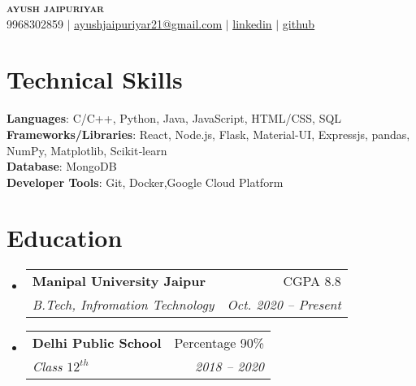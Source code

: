\documentclass[a4paper,11pt]{article}
\makeatletter
\newcommand{\resumeSubheading}[4]{
    \vspace{-2pt}\item
    \begin{tabular*}{0.97\textwidth}[t]{l@{\extracolsep{\fill}}r}
        \textbf{#1} & #2 \\
        \textit{\small#3} & \textit{\small #4} \\
    \end{tabular*}\vspace{-7pt}
}
\newcommand{\resumeSubHeadingListStart}{\begin{itemize}[leftmargin=0.15in, label={}]}
\newcommand{\resumeSubHeadingListEnd}{\end{itemize}}
\makeatother
\begin{document}

\begin{center}
    \textbf{\Huge \scshape ayush jaipuriyar} \\ \vspace{1pt}
    \small 9968302859 $|$ \href{mailto:ayushjaipuriyar21@gmail.com}{\underline{ayushjaipuriyar21@gmail.com}} $|$
    \href{https://www.linkedin.com/in/ayushjaipuriyar}{\underline{linkedin}} $|$
    \href{https://github.com/ayushjaipuriyar/}{\underline{github}}
\end{center}

%
\section{Technical Skills}
\begin{itemize}[leftmargin=0.15in, label={}]
    \small{\item{
                    \textbf{Languages}{: C/C++, Python, Java, JavaScript, HTML/CSS, SQL} \\
                    \textbf{Frameworks/Libraries}{: React, Node.js, Flask, Material-UI, Expressjs, pandas, NumPy, Matplotlib, Scikit‑learn} \\
                    \textbf{Database}{: MongoDB} \\
                    \textbf{Developer Tools}{: Git, Docker,Google Cloud Platform} \\
              }}
\end{itemize}

%

\section{Education}
\resumeSubHeadingListStart
\resumeSubheading
{Manipal University Jaipur}{CGPA 8.8}
{B.Tech, Infromation Technology}{Oct. 2020 -- Present}
\resumeSubheading
{Delhi Public School}{Percentage 90\%}
{Class $12^{th}$}{2018 -- 2020}
\resumeSubHeadingListEnd
\end{document}
